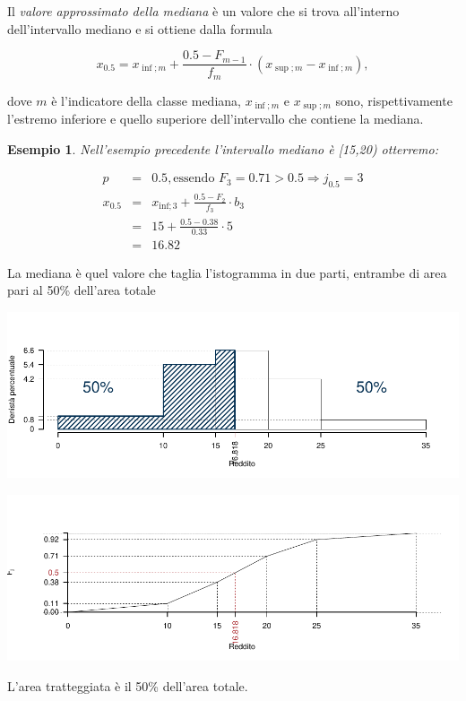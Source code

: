 \documentclass[
  11pt,
]{book}
\theoremstyle{mytheoremstyle}
\theoremstyle{mydefstyle}
\newtheorem{example}{{Esempio}}[section]
\newenvironment{nota}
  {
\begin{tcolorbox}[enhanced,breakable,arc=0.1mm,boxrule=1pt,colback=white,colframe=iblue,title=\bf \fontfamily{lmss}\selectfont \faInfoCircle \hspace{.5 cm} Nota,drop fuzzy shadow]
}{
\end{tcolorbox}
  }
\begin{document}
Il \emph{valore approssimato della mediana} è un valore che si trova all'interno dell'intervallo mediano e si ottiene dalla formula

\begin{info}
\[x_{0.5}=x_{\inf;m}+\frac{0.5-F_{m-1}}{f_m}\cdot \left(x_{\sup;m}-x_{\inf;m} \right),\]

\end{info}

dove \(m\) è l'indicatore della classe mediana, \(x_{\inf;m}\) e \(x_{\sup;m}\) sono, rispettivamente l'estremo inferiore e quello superiore dell'intervallo che contiene la mediana.

\begin{example}
Nell'esempio precedente l'intervallo mediano è {[}15,20) otterremo:

\begin{eqnarray*}
  p &=&  0.5 , \text{essendo }F_{ 3 }= 0.71  > 0.5  \Rightarrow j_{ 0.5 }= 3 \\
  x_{ 0.5 } &=& x_{\text{inf}; 3 } + \frac{ { 0.5 } - F_{ 2 }} {f_{ 3 }} \cdot b_{ 3 } \\
            &=&  15  + \frac {{ 0.5 } -  0.38 } { 0.33 } \cdot  5  \\
            &=&  16.82 
\end{eqnarray*}
\end{example}

\begin{nota}
La mediana è quel valore che taglia l'istogramma in due parti, entrambe di area pari al 50\% dell'area totale

\begin{center}\includegraphics{Appunti_di_Statistica_2025_files/figure-latex/04-mediana-percentili-1,-1} \end{center}

\begin{center}\includegraphics{Appunti_di_Statistica_2025_files/figure-latex/04-mediana-percentili-1,-2} \end{center}

L'area tratteggiata è il 50\% dell'area totale.

\end{nota}
\end{document}
